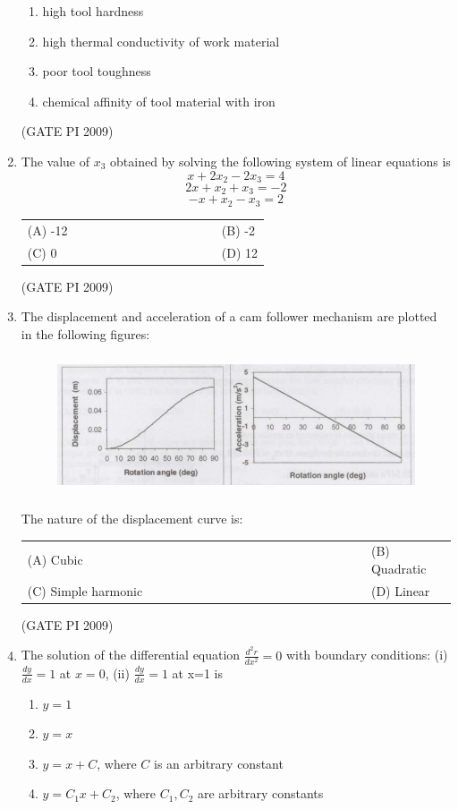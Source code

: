 \documentclass[journal,12pt,onecolumn]{IEEEtran}
\theoremstyle{remark}
\begin{document}
\begin{enumerate}[label=Q.\arabic*, leftmargin=*]
\begin{enumerate}[label=(\Alph*)]
\item high tool hardness
\item high thermal conductivity of work material
\item poor tool toughness
\item chemical affinity of tool material with iron
\end{enumerate}
\hfill (GATE PI 2009)
\item The value of $x_3$ obtained by solving the following system of linear equations is
$$x + 2x_2 - 2x_3 = 4$$ 
$$2x + x_2 + x_3 = -2 $$
$$-x + x_2 - x_3 = 2$$
\begin{multicols}{2}
\begin{tabular}[t]{p{0.8\linewidth} p{0.9\linewidth}}
(A) -12 & (B) -2 \\
(C) 0 & (D) 12 \\
\end{tabular}
\end{multicols} 
\hfill (GATE PI 2009)
\item The displacement and acceleration of a cam follower mechanism are plotted in the following figures:
\begin{figure}[h]
    \centering
    \includegraphics[height=11em,width=1\linewidth]{figs/1.png}
    \label{fig:placeholder}
\end{figure} 
The nature of the displacement curve is:
\begin{multicols}{2}
\begin{tabular}[t]{p{0.8\linewidth} p{0.9\linewidth}}
(A) Cubic & (B) Quadratic \\
(C) Simple harmonic & (D) Linear 
\end{tabular}
\end{multicols}
\hfill (GATE PI 2009)
\item The solution of the differential equation
$
\frac{d^2 r}{dx^2} = 0
$
with boundary conditions: (i) $\frac{dy}{dx} = 1$ at $x = 0$, (ii) $\frac{dy}{dx} = 1$ at x=1 is
\begin{enumerate}[label=(\Alph*)]
\item $y = 1$ 
\item $y = x$ 
\item $y = x + C$, where $C$ is an arbitrary constant  
\item $y = C_1 x + C_2$, where $C_1, C_2$ are arbitrary constants 


\end{enumerate}
\end{enumerate}
\end{document}
